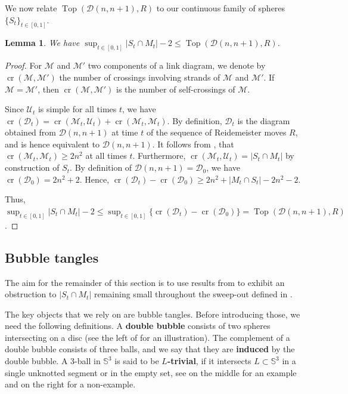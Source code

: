 \documentclass[10pt,a4paper]{amsart}
\newcommand{\Sp}{\mathbb{S}}
\newcommand{\cross}{\operatorname{cr}}
\newcommand{\addcross}{\operatorname{Top}}
\newtheorem{lemma}[theorem]{Lemma}
\begin{document}
We now relate $\addcross(\mathcal{D}(n,n+1),R)$ to our continuous family of spheres $\{S_t\}_{t\in [0,1]}$.

\begin{lemma}\label{lem_inter_sphere}
We have $\sup_{t \in [0,1]} |S_t \cap M_t| -2 \leq \addcross(\mathcal{D}(n,n+1), R)$.
\end{lemma}

\begin{proof}
For $\mathcal{M}$ and $\mathcal{M}'$ two components of a link diagram, we denote by $\cross(\mathcal{M},\mathcal{M}')$ the number of crossings involving strands of $\mathcal{M}$ and $\mathcal{M}'$. If $\mathcal{M} = \mathcal{M}'$, then $\cross(\mathcal{M},\mathcal{M}')$ is the number of self-crossings of $\mathcal{M}$.

Since $\mathcal{U}_t$ is simple for all times $t$, we have $\cross(\mathcal{D}_t) = \cross(\mathcal{M}_t,\mathcal{U}_t) + \cross(\mathcal{M}_t,\mathcal{M}_t)$. By definition, $\mathcal{D}_t$ is the diagram obtained from $\mathcal{D}(n,n+1)$ at time $t$ of the sequence of Reidemeister moves $R$, and is hence equivalent to $\mathcal{D}(n,n+1)$. It follows from , that $\cross(\mathcal{M}_t,\mathcal{M}_t) \geq 2n^2$ at all times $t$. Furthermore, $\cross(\mathcal{M}_t,\mathcal{U}_t) = |S_t \cap M_t|$ by construction of $S_t$. By definition of $\mathcal{D}(n,n+1) = \mathcal{D}_0$, we have $\cross(\mathcal{D}_0)= 2n^2 +2$. Hence, $\cross(\mathcal{D}_t) - \cross(\mathcal{D}_0) \geq 2n^2 + |M_t \cap S_t| - 2n^2 -2 $.

Thus, $\sup_{t \in [0,1]} |S_t \cap M_t| -2 \leq \sup_{t \in [0,1]} \{\cross(\mathcal{D}_t) - \cross(\mathcal{D}_0)\} = \addcross(\mathcal{D}(n,n+1), R)$.
\end{proof}


\subsection{Bubble tangles}
\label{sec:bubbletangles}

The aim for the remainder of this section is to use results from \cite{Lunel_spherewidth_out} to exhibit an obstruction to $|S_t \cap M_t|$ remaining small throughout the sweep-out defined in .

The key objects that we rely on are bubble tangles. Before introducing those, we need the following definitions. A \textbf{double bubble} consists of two spheres intersecting on a disc (see the left of  for an illustration). The complement of a double bubble consists of three balls, and we say that they are \textbf{induced} by the double bubble. A $3$-ball in $\Sp^3$ is said to be \textbf{$L$-trivial}, if it intersects $L \subset \Sp^3$ in a single unknotted segment or in the empty set, see  on the middle for an example and on the right for a non-example.
\end{document}
